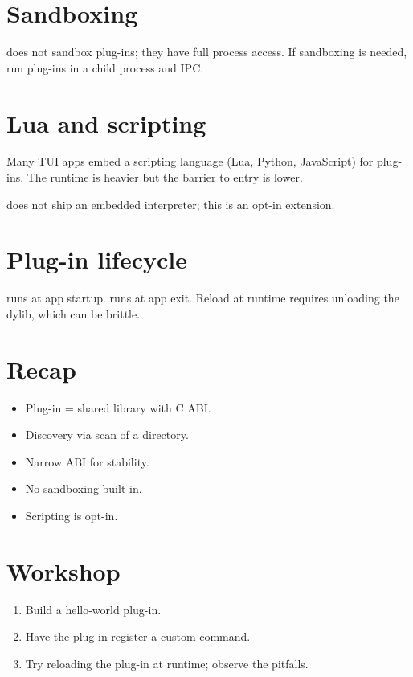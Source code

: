 \section{Sandboxing}

\maya{} does not sandbox plug-ins; they have full process
access. If sandboxing is needed, run plug-ins in a child
process and IPC.

\section{Lua and scripting}

Many TUI apps embed a scripting language (Lua, Python,
JavaScript) for plug-ins. The runtime is heavier but the
barrier to entry is lower.

\maya{} does not ship an embedded interpreter; this is an
opt-in extension.

\section{Plug-in lifecycle}

 runs at app startup.  runs at
app exit. Reload at runtime requires unloading the dylib,
which can be brittle.

\section{Recap}

\begin{recap}
\begin{itemize}[leftmargin=*]
  \item Plug-in = shared library with C ABI.
  \item Discovery via scan of a directory.
  \item Narrow ABI for stability.
  \item No sandboxing built-in.
  \item Scripting is opt-in.
\end{itemize}
\end{recap}

\section*{Workshop}

\begin{enumerate}[leftmargin=*]
  \item Build a hello-world plug-in.
  \item Have the plug-in register a custom command.
  \item Try reloading the plug-in at runtime; observe the
    pitfalls.
\end{enumerate}
